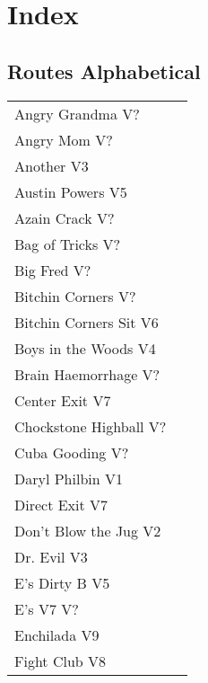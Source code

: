 \chapter{Index}
\lhead{\textcolor{\chapterColor}{\rule[-2pt]{\textwidth}{15pt}}}
\section{Routes Alphabetical}
\begin{center}
\begin{supertabular}{lr}
Angry Grandma V? & \pageref{rt:Angry Grandma} \\
Angry Mom V? & \pageref{rt:Angry Mom} \\
Another V3 & \pageref{rt:Another} \\
Austin Powers V5 & \pageref{rt:Austin Powers} \\
Azain Crack V? & \pageref{rt:Azain Crack} \\
Bag of Tricks V? & \pageref{rt:Bag of Tricks} \\
Big Fred V? & \pageref{rt:Big Fred} \\
Bitchin Corners V? & \pageref{rt:Bitchin Corners} \\
Bitchin Corners Sit V6 & \pageref{vr:Bitchin Corners Sit} \\
Boys in the Woods V4 & \pageref{rt:Boys in the Woods} \\
Brain Haemorrhage V? & \pageref{rt:Brain Haemorrhage} \\
Center Exit V7 & \pageref{vr:Center Exit} \\
Chockstone Highball V? & \pageref{rt:Chockstone Highball} \\
Cuba Gooding V? & \pageref{rt:Cuba Gooding} \\
Daryl Philbin V1 & \pageref{rt:Daryl Philbin} \\
Direct Exit V7 & \pageref{vr:Direct Exit} \\
Don't Blow the Jug V2 & \pageref{rt:Don't Blow the Jug} \\
Dr. Evil V3 & \pageref{rt:Dr. Evil} \\
E's Dirty B V5 & \pageref{rt:E's Dirty B} \\
E's V7 V? & \pageref{rt:E's V7} \\
Enchilada V9 & \pageref{rt:Enchilada} \\
Fight Club V8 & \pageref{rt:Fight Club} \\

\end{supertabular}
\end{center}

